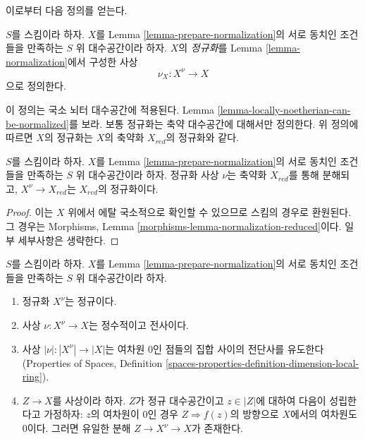 \noindent
이로부터 다음 정의를 얻는다.

\begin{definition}
\label{definition-normalization}
$S$를 스킴이라 하자. $X$를 Lemma
\ref{lemma-prepare-normalization}의 서로 동치인 조건들을 만족하는 $S$ 위
대수공간이라 하자. $X$의 {\it 정규화}를 Lemma
\ref{lemma-normalization}에서 구성한 사상
$$
\nu_X : X^\nu \longrightarrow X
$$
으로 정의한다.
\end{definition}

\noindent
이 정의는 국소 뇌터 대수공간에 적용된다. Lemma
\ref{lemma-locally-noetherian-can-be-normalized}를 보라. 보통 정규화는
축약 대수공간에 대해서만 정의한다. 위 정의에 따르면 $X$의 정규화는
$X$의 축약화 $X_{red}$의 정규화와 같다.

\begin{lemma}
\label{lemma-normalization-reduced}
$S$를 스킴이라 하자. $X$를 Lemma
\ref{lemma-prepare-normalization}의 서로 동치인 조건들을 만족하는 $S$ 위
대수공간이라 하자. 정규화 사상 $\nu$는 축약화 $X_{red}$를 통해
분해되고, $X^\nu \to X_{red}$는 $X_{red}$의 정규화이다.
\end{lemma}

\begin{proof}
이는 $X$ 위에서 에탈 국소적으로 확인할 수 있으므로 스킴의 경우로
환원된다. 그 경우는 Morphisms, Lemma
\ref{morphisms-lemma-normalization-reduced}이다. 일부 세부사항은 생략한다.
\end{proof}

\begin{lemma}
\label{lemma-normalization-normal}
$S$를 스킴이라 하자. $X$를 Lemma
\ref{lemma-prepare-normalization}의 서로 동치인 조건들을 만족하는 $S$ 위
대수공간이라 하자.
\begin{enumerate}
\item 정규화 $X^\nu$는 정규이다.
\item 사상 $\nu : X^\nu \to X$는 정수적이고 전사이다.
\item 사상 $|\nu| : |X^\nu| \to |X|$는 여차원 $0$인 점들의 집합 사이의
전단사를 유도한다(Properties of Spaces, Definition
\ref{spaces-properties-definition-dimension-local-ring}).
\item $Z \to X$를 사상이라 하자. $Z$가 정규 대수공간이고
$z \in |Z|$에 대하여 다음이 성립한다고 가정하자: $z$의 여차원이 $0$인
경우 $Z \Rightarrow f(z)$의 방향으로 $X$에서의 여차원도 $0$이다. 그러면
유일한 분해 $Z \to X^\nu \to X$가 존재한다.
\end{enumerate}
\end{lemma}


